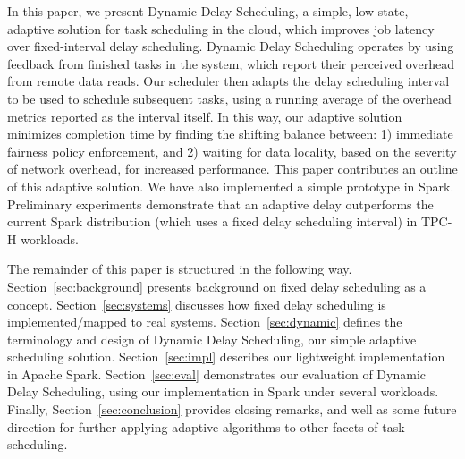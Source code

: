 In this paper, we present Dynamic Delay Scheduling, a simple, low-state, adaptive
solution for task scheduling in the cloud, which improves job latency over
fixed-interval delay scheduling. Dynamic Delay Scheduling operates by using feedback from finished
tasks in the system, which report their perceived overhead from remote data
reads. Our scheduler then adapts the delay scheduling interval to be used to schedule subsequent
tasks, using a running average of the overhead metrics reported as the interval
itself. In this way, our adaptive solution minimizes completion time by finding the shifting balance between:
1) immediate fairness policy enforcement, and 2) waiting for data locality, based on the severity of network overhead,
for increased performance.
This paper contributes an outline of this adaptive solution. We have
also implemented a simple prototype in Spark. Preliminary experiments demonstrate that
an adaptive delay outperforms the current Spark distribution (which uses a fixed delay
scheduling interval) in TPC-H workloads. 

The remainder of this paper is structured in the following way. Section~\ref{sec:background}
presents background on fixed delay scheduling as a concept. Section~\ref{sec:systems} discusses how fixed delay
scheduling is implemented/mapped to real systems. Section~\ref{sec:dynamic} defines the terminology and
design of Dynamic Delay Scheduling, our simple adaptive scheduling solution. Section~\ref{sec:impl} describes our
lightweight implementation in Apache Spark. Section~\ref{sec:eval} demonstrates our evaluation of Dynamic
Delay Scheduling, using our implementation in Spark under several workloads. Finally, 
Section~\ref{sec:conclusion} provides closing remarks, and well as some future direction for further
applying adaptive algorithms to other facets of task scheduling.

